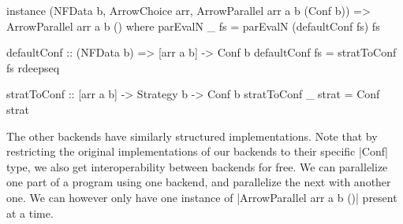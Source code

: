 \begin{code}
instance (NFData b, ArrowChoice arr, ArrowParallel arr a b (Conf b)) => ArrowParallel arr a b () where
    parEvalN _ fs = parEvalN (defaultConf fs) fs

defaultConf :: (NFData b) => [arr a b] -> Conf b
defaultConf fs = stratToConf fs rdeepseq

stratToConf :: [arr a b] -> Strategy b -> Conf b
stratToConf _ strat = Conf strat
\end{code}

The other backends have similarly structured implementations. Note that by restricting the original implementations of our backends to their specific |Conf| type, we also get interoperability between backends for free. We can parallelize one part of a program using one backend, and parallelize the next with another one. We can however only have one instance of |ArrowParallel arr a b ()| present at a time.





